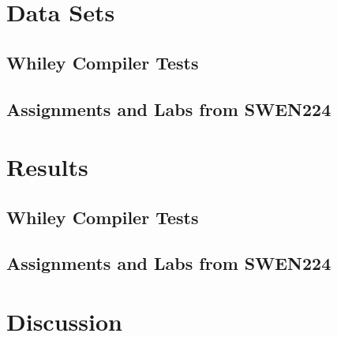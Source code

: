 \section{Data Sets}

\subsection{Whiley Compiler Tests}

\subsection{Assignments and Labs from SWEN224}

\section{Results}

\subsection{Whiley Compiler Tests}

\subsection{Assignments and Labs from SWEN224}

\section{Discussion}
